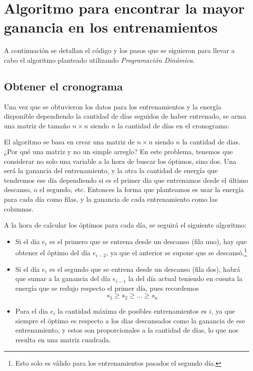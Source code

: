 \section{Algoritmo para encontrar la mayor ganancia en los entrenamientos}

A continuación se detallan el código y los pasos que se siguieron para llevar a cabo el algoritmo planteado utilizando \textit{Programación Dinámica}.

\subsection{Obtener el cronograma}

Una vez que se obtuvieron los datos para los entrenamientos y la energía disponible dependiendo la cantidad de días seguidos de haber entrenado, se arma una matriz de tamaño $n \times n$ siendo $n$ la cantidad de días en el cronograma:



El algoritmo se basa en crear una matriz de $n \times n$ siendo $n$ la cantidad de dias. ¿Por qué una matriz y no un simple arreglo? En este problema, tenemos que considerar no solo una variable a la hora de buscar los óptimos, sino dos. Una será la ganancia del entrenamiento, y la otra la cantidad de energía que tendremos ese día dependiendo si es el primer día que entrenamos desde el último descanso, o el segundo, etc. Entonces la forma que planteamos es usar la energía para cada día como filas, y la ganancia de cada entrenamiento como las columnas.

A la hora de calcular los óptimos para cada día, se seguirá el siguiente algoritmo:
\begin{itemize}
    \item Si el dia $e_i$ es el primero que se entrena desde un descanso (fila uno), hay que obtener el óptimo del día $e_{i-2}$, ya que el anterior se supone que se descansó.\footnote{Esto solo es válido para los entrenamientos pasados el segundo día.}
    \item Si el día $e_i$ es el segundo que se entrena desde un descanso (fila dos), habrá que sumar a la ganancia del día $e_{i-1}$ la del día actual teniendo en cuenta la energía que se redujo respecto el primer día, pues recordemos 
    \[ s_1 \geq s_2 \geq ... \geq s_n\]
    \item Para el dia $e_i$ la cantidad máxima de posibles entrenamientos es $i$, ya que siempre el óptimo es respecto a los dias descansados como la ganancia de ese entrenamiento, y estos son proporcionales a la cantidad de días, lo que nos resulta en una matriz cuadrada.
\end{itemize}

